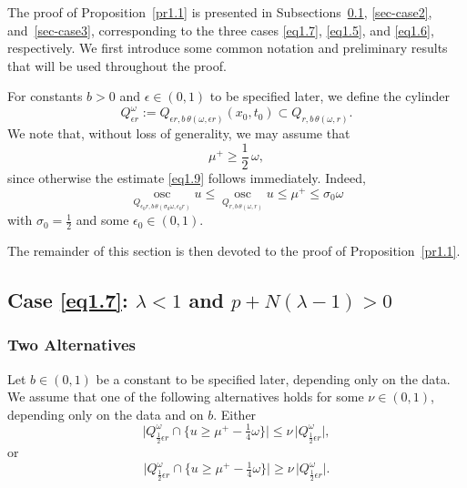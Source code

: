 \documentclass[a4paper,11pt,fullpage]{article}
\DeclareMathOperator*{\osc}{osc}
\numberwithin{equation}{section}
\begin{document}
\noindent The proof of Proposition~\ref{pr1.1} is presented in Subsections~\ref{sec-case1}, \ref{sec-case2}, and~\ref{sec-case3}, corresponding to the three cases  \eqref{eq1.7}, \eqref{eq1.5}, and \eqref{eq1.6}, respectively. We first introduce some common notation and preliminary results that will be used throughout the proof.

\noindent For constants $b>0$ and $\epsilon\in(0,1)$ to be specified later, we define the
cylinder
\begin{equation*}
Q^{\omega}_{\epsilon r}:=Q_{\epsilon r, b\,\theta(\omega,\epsilon r)}(x_0, t_0)\subset Q_{r,b\,\theta(\omega, r)}. 
\end{equation*}
We note that, without loss of generality, we may assume that
\begin{equation}\label{eq4.1}
\mu^{+} \geqslant \frac{1}{2}\,\omega,
\end{equation}
since otherwise the estimate \eqref{eq1.9} follows immediately. Indeed,
\begin{equation*}
\osc\limits_{Q_{\epsilon_0 r,  b\,\theta(\sigma_0\omega, \epsilon_0 r)}} u \leqslant \osc\limits_{Q_{r,  b\,\theta(\omega,r)}} u \leqslant\mu^+\leqslant\sigma_0\omega
\end{equation*}
with $\sigma_0=\tfrac{1}{2}$ and some $\epsilon_0\in(0,1)$.

The remainder of this section is then devoted to the proof of Proposition~\ref{pr1.1}.

\subsection{Case \eqref{eq1.7}: $\lambda<1$ and $p+N(\lambda-1)>0$ }\label{sec-case1}

\subsubsection{Two Alternatives}

Let $b\in(0,1)$ be a constant to be specified later, depending only on the data. We assume that one of the following alternatives holds for some $\nu\in(0,1)$, depending only on the data and on $b$. 
Either
\begin{equation}\label{eq4.4}
\bigl|Q^{\omega}_{\frac{1}{2}\epsilon r}\cap\{u\geqslant \mu^{+}-\tfrac{1}{4}\omega\}\bigr|\leqslant\nu\,\bigl|Q^{\omega}_{\frac{1}{2}\epsilon r}\bigr|,
\end{equation}
or
\begin{equation}\label{eq4.5}
\bigl|Q^{\omega}_{\frac{1}{2}\epsilon r}\cap\{u\geqslant \mu^{+}-\tfrac{1}{4}\omega\}\bigr|\geqslant\nu\,\bigl|Q^{\omega}_{\frac{1}{2}\epsilon r}\bigr|.
\end{equation}
\end{document}
